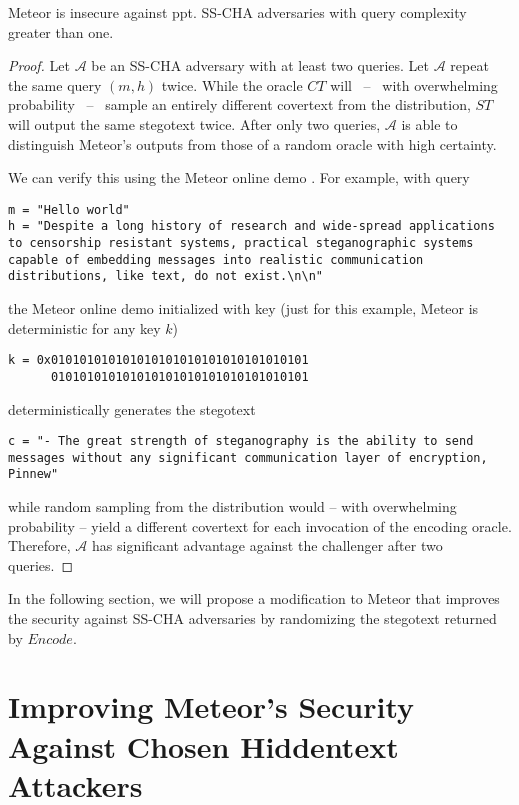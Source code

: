 \begin{theorem}
  Meteor is insecure against ppt. SS-CHA adversaries with query complexity greater than one.
\end{theorem}
\begin{proof}
Let $\mathcal{A}$ be an SS-CHA adversary with at least two queries.
Let $\mathcal{A}$ repeat the same query $(m,h)$ twice.
While the oracle $CT$ will~ --~ with overwhelming probability~ --~ sample an entirely different covertext from the distribution,  $ST$ will output the same stegotext twice.
After only two queries, $\mathcal{A}$ is able to distinguish Meteor's outputs from those of a random oracle with high certainty.

We can verify this using the Meteor online demo \cite{MeteorDemo2021}.
For example, with query
\begin{lstlisting}
m = "Hello world"
h = "Despite a long history of research and wide-spread applications to censorship resistant systems, practical steganographic systems capable of embedding messages into realistic communication distributions, like text, do not exist.\n\n"
\end{lstlisting}
the Meteor online demo initialized with key (just for this example, Meteor is deterministic for any key $k$)
\begin{lstlisting}
k = 0x010101010101010101010101010101010101
      010101010101010101010101010101010101
\end{lstlisting}
deterministically generates the stegotext
\begin{lstlisting}
c = "- The great strength of steganography is the ability to send messages without any significant communication layer of encryption, Pinnew"
\end{lstlisting}
while random sampling from the distribution would -- with overwhelming probability -- yield a different covertext for each invocation of the encoding oracle.
Therefore, $\mathcal{A}$ has significant advantage against the challenger after two queries.
\end{proof}

In the following section, we will propose a modification to Meteor that improves the security against SS-CHA adversaries by randomizing the stegotext returned by $Encode$.

\section{Improving Meteor's Security Against Chosen Hiddentext Attackers}

